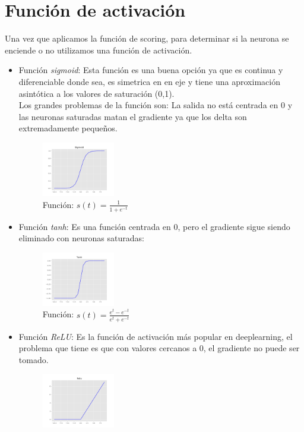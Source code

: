 \documentclass{article}
\begin{document}
\section{Función de activación}
Una vez que aplicamos la función de scoring, para determinar si la neurona se enciende o no utilizamos una función de
activación.
\begin{itemize}
 \item Función \textit{sigmoid}: Esta función es una buena opción ya que es continua y diferenciable donde sea, es simetrica
 en en eje y tiene una aproximación asintótica a los valores de saturación (0,1).\\
 Los grandes problemas de la función son: La salida no está centrada en 0 y las neuronas saturadas matan el gradiente 
 ya que los delta son extremadamente pequeños.
 \begin{figure}[H]
  \centering
  \includegraphics[width=0.3\textwidth]{images/Sigmoid.png}
  \caption{Función: $s(t) = \frac{1}{1+e^{-t}}$}
  \end{figure}
 \item Función \textit{tanh}: Es una función centrada en 0, pero el gradiente sigue siendo eliminado con neuronas 
  saturadas: 
 \begin{figure}[H]
  \centering
  \includegraphics[width=0.3\textwidth]{images/Tanh.png}
  \caption{Función: $s(t) = \frac{e^t -e^{-t} }{e^{t}+e^{-t}}$}
 \end{figure}
 \item Función \textit{ReLU}: Es la función de activación más popular en deeplearning, el problema que tiene 
 es que con valores cercanos a 0, el gradiente no puede ser tomado. 
 \begin{figure}[H]
  \centering
  \includegraphics[width=0.3\textwidth]{images/Relu.png}

\end{figure}
\end{itemize}
\end{document}
